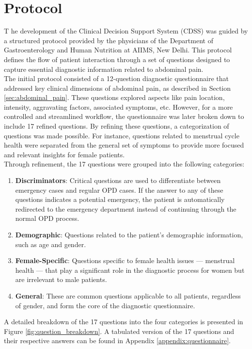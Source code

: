 \section{Protocol}
\lettrine{T}{ }he development of the Clinical Decision Support System (CDSS) was guided by a structured protocol provided by the physicians of the Department of Gastroenterology and Human Nutrition at AIIMS, New Delhi. This protocol defines the flow of patient interaction through a set of questions designed to capture essential diagnostic information related to abdominal pain.\\[\baselineskip]

\noindent The initial protocol consisted of a 12-question diagnostic questionnaire that addressed key clinical dimensions of abdominal pain, as described in Section \ref{sec:abdominal_pain}. These questions explored aspects like pain location, intensity, aggravating factors, associated symptoms, etc. However, for a more controlled and streamlined workflow, the questionnaire was later broken down to include 17 refined questions. By refining these questions, a categorization of questions was made possible. For instance, questions related to menstrual cycle health were separated from the general set of symptoms to provide more focused and relevant insights for female patients.\\[\baselineskip]

\noindent Through refinement, the 17 questions were grouped into the following categories:
\begin{enumerate}
    \item \textcolor{TUMRed}{\textbf{Discriminators}}: Critical questions are used to differentiate between emergency cases and regular OPD cases. If the answer to any of these questions indicates a potential emergency, the patient is automatically redirected to the emergency department instead of continuing through the normal OPD process.
    \item \textcolor{TUMRed}{\textbf{Demographic}}: Questions related to the patient's demographic information, such as age and gender.
    \item \textcolor{TUMRed}{\textbf{Female-Specific}}: Questions specific to female health issues --- menstrual health --- that play a significant role in the diagnostic process for women but are irrelevant to male patients.
    \item \textcolor{TUMRed}{\textbf{General}}: These are common questions applicable to all patients, regardless of gender, and form the core of the diagnostic questionnaire.
\end{enumerate}
A detailed breakdown of the 17 questions into the four categories is presented in Figure \ref{fig:question_breakdown}. A tabulated version of the 17 questions and their respective answers can be found in Appendix \ref{appendix:questionnaire}.

